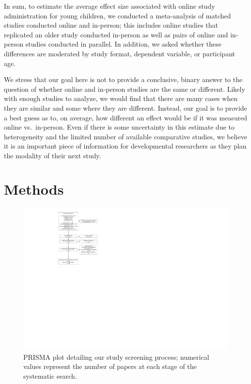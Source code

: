 \documentclass[
  man,floatsintext]{apa6}
\begin{document}
In sum, to estimate the average effect size associated with online study administration for young children, we conducted a meta-analysis of matched studies conducted online and in-person; this includes online studies that replicated an older study conducted in-person as well as pairs of online and in-person studies conducted in parallel. In addition, we asked whether these differences are moderated by study format, dependent variable, or participant age.

We stress that our goal here is not to provide a conclusive, binary answer to the question of whether online and in-person studies are the same or different. Likely with enough studies to analyze, we would find that there are many cases when they are similar and some where they are different. Instead, our goal is to provide a best guess as to, on average, how different an effect would be if it was measured online vs.~in-person. Even if there is some uncertainty in this estimate due to heterogeneity and the limited number of available comparative studies, we believe it is an important piece of information for developmental researchers as they plan the modality of their next study.

\hypertarget{methods}{%
\section{Methods}\label{methods}}

\begin{figure}
\centering
\includegraphics{OnlineMA_main_files/figure-latex/prisma-1.pdf}
\caption{\label{fig:prisma}PRISMA plot detailing our study screening process; numerical values represent the number of papers at each stage of the systematic search.}
\end{figure}
\end{document}

